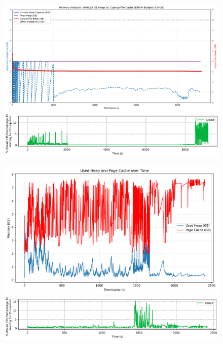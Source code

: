 \begin{figure}[!t]
    \centering

    \begin{minipage}[t]{0.49\textwidth}
        \centering
        \includegraphics[width=\linewidth]{fig/combined_memory_timeline_vanilla_g1.png}
        \vspace{0.5em}
        \includegraphics[width=\linewidth]{fig/iow_cpu_teraheap.png}
        \label{fig:lucene-m1_th}
    \end{minipage}
    \hfill
    \begin{minipage}[t]{0.49\textwidth}
        \centering
        \includegraphics[width=\linewidth]{fig/flexheap_debug.png}
        \vspace{0.5em}
        \includegraphics[width=\linewidth]{fig/iow_cpu_flex.png}
        \label{fig:lucene-m1_flex}
    \end{minipage}


\end{figure}
